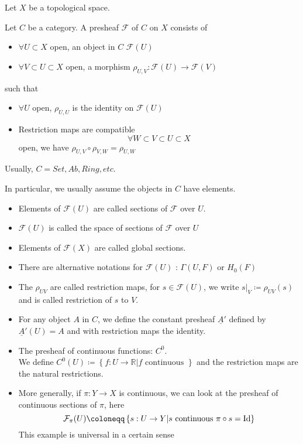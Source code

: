 \documentclass[../main.tex]{subfiles}
\begin{document}
Let $X$ be a topological space.
\begin{defn}[Presheaf]
	Let $C$ be a category. A presheaf $\mathcal{F}$ of $C$ on $X$ consists of 
	\begin{itemize}
	\item $\forall U \subset X$ open, an object in $C$ $\mathcal{F}( U) $ 
	\item $\forall V \subset U \subset X$ open, a morphism $\rho_{U,V} : \mathcal{F}( U) \to \mathcal{F}( V) $ 
	\end{itemize}
	such that 
	\begin{itemize}
	\item $\forall U$ open, $\rho_{U,U} $ is the identity on $\mathcal{F}( U) $ 
	\item Restriction maps are compatible
		\[ 
			\forall W \subset V \subset U \subset X
		\]
		open, we have $\rho_{U,V} \circ \rho_{V,W} = \rho_{U,W} $ 
	\end{itemize}
	
\end{defn}
\begin{rmq}
Usually, $C = Set, Ab, Ring, etc.$ 
\end{rmq}
In particular, we usually assume the objects in $C$ have elements.
\begin{rmq}
\begin{itemize}
\item Elements of $\mathcal{F}( U) $ are called sections of $\mathcal{F}$ over $U$.
\item $\mathcal{F}( U) $ is called the space of sections of $\mathcal{F}$ over $U$ 
\item Elements of $\mathcal{F}( X) $ are called global sections.
\item There are alternative notations for $\mathcal{F}( U) $ : $ \Gamma( U,F) $ or $H_0( F) $ 
\item The $\rho_{UV} $ are called restriction maps, for $s\in \mathcal{F}( U) $, we write $s|_V \coloneqq  \rho_{UV} ( s) $ and is called restriction of $s$ to $V$.
\end{itemize}
\end{rmq}
\begin{exemple}
\begin{itemize}
	\item For any object $A$ in $C$, we define the constant presheaf $ \underline{A}'$ defined by $\underline{A}'( U) = A $ and with restriction maps the identity.
	\item The presheaf of continuous functions: $C^{0}$.\\
		We define $C^{0}( U) \coloneqq \left\{ f:U\to \mathbb{R}| f \text{ continuous }  \right\} $ and the restriction maps are the natural restrictions.
	\item More generally, if $\pi:Y\to X$ is continuous, we can look at the presheaf of continuous sections of $\pi$, here
		\[ 
		\mathcal{F}_\pi( U) \coloneqq  \left\{ s:U \to Y | s \text{ continuous } \pi \circ s = \id \right\} 
		\]
		This example is universal in a certain sense
\end{itemize}
\end{exemple}
\end{document}

